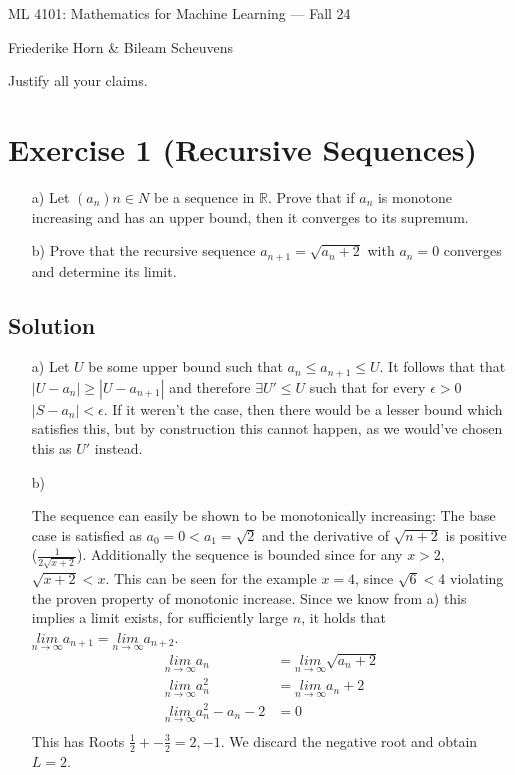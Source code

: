 \documentclass[10pt]{article}
\numberwithin{equation}{section}
\newcommand{\limn}{\underset{n\rightarrow \infty}{lim}}
\begin{document}
\begin{center}
    \sc ML 4101: Mathematics for Machine Learning --- Fall 24
\end{center}

\noindent Friederike Horn \& Bileam Scheuvens

Justify all your claims.
\section*{Exercise 1 (Recursive Sequences)}
\begin{enumerate}
\item[a)]{
  Let $(a_n)n\in N$ be a sequence in $\mathbb{R}$. Prove that if $a_n$ is monotone increasing and has an upper bound, then it converges to its supremum.
  }
\item[b)]{
    Prove that the recursive sequence $a_{n+1} = \sqrt{a_n + 2}$ with $a_n = 0$ converges and determine its limit.
  }
\end{enumerate}
\subsection*{Solution}
\begin{enumerate}
\item[a)]{
    Let $U$ be some upper bound such that $a_n \leq a_{n+1} \leq U$.
  It follows that that $|U-a_n| \geq |U - a_{n+1}|$ and therefore $\exists U' \leq U$ such that for every $\epsilon > 0$ $|S-a_n| < \epsilon$. If it weren't the case, then there would be a lesser bound which satisfies this, but by construction this cannot happen, as we would've chosen this as $U'$ instead.
  }
\item[b)]{
    The sequence can easily be shown to be monotonically increasing:
    The base case is satisfied as $a_0 = 0 < a_1 = \sqrt{2}$ and the derivative of $\sqrt{n+2}$ is positive ($\frac{1}{2\sqrt{x+2}}$).
    Additionally the sequence is bounded since for any $x > 2$, $\sqrt{x+2}< x$. This can be seen for the example $x=4$, since $\sqrt{6} < 4$ violating the proven property of monotonic increase.
    Since we know from a) this implies a limit exists, for sufficiently large $n$, it holds that $\underset{n\rightarrow \infty}{lim} a_{n+1} = \underset{n\rightarrow \infty}{lim} a_{n+2}$.
    \begin{align*}
      \limn a_n &= \limn \sqrt{a_n+2}\\
      \limn a_n^2 &= \limn a_n+2\\
      \limn a_n^2 -a_n -2 &= 0\\
    \end{align*}
    This has Roots $\frac{1}{2} +- \frac{3}{2} = 2, -1$.
    We discard the negative root and obtain $L = 2$.


  }

\end{enumerate}
\end{document}
